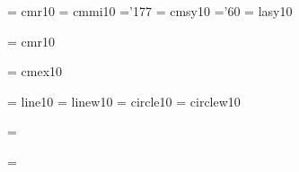  \font\twtyrm  = cmr10     %
 \font\twtymi  = cmmi10    %
    \skewchar\twtymi ='177          %
 \font\twtysy  = cmsy10    %
    \skewchar\twtysy ='60           %
 \font\twtyly  = lasy10   %

 \font\twfvrm  = cmr10     %

 \font\tenex   = cmex10 

\font\tenln    = line10
\font\tenlnw   = linew10  
\font\tencirc  = circle10
\font\tencircw = circlew10 

%
\ifnum{}\tenln=\tencirc \else 
  \immediate{}\fi
\ifnum{}\tenlnw=\tencircw \else 
  \immediate{}\fi


